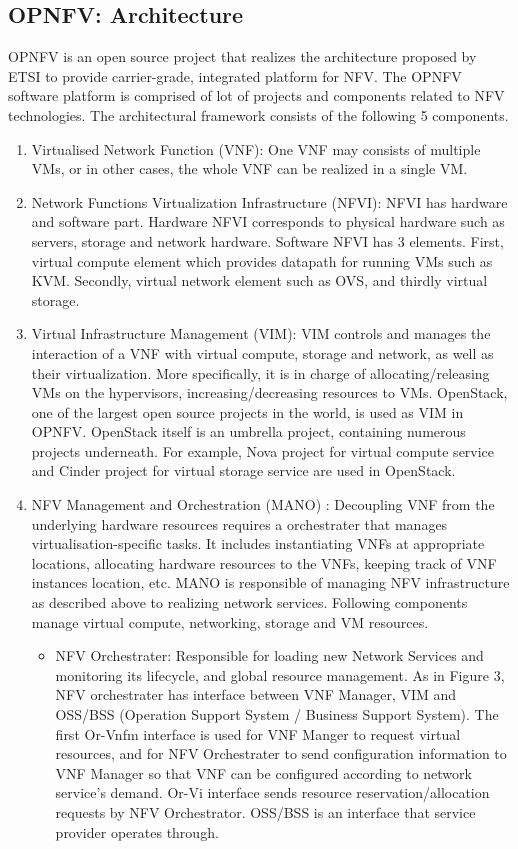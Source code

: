 \subsection{OPNFV: Architecture}
OPNFV\cite{OPNFV} is an open source project that realizes the architecture proposed by ETSI to provide carrier-grade, integrated platform for NFV. The OPNFV software platform is comprised of lot of projects and components related to NFV technologies. The architectural framework consists of the following 5 components. 
\begin{enumerate}
	\item Virtualised Network Function (VNF): One VNF may consists of multiple VMs, or in other cases, the whole VNF can be realized in a single VM.  
	\item Network Functions Virtualization Infrastructure (NFVI): NFVI has hardware and software part. Hardware NFVI corresponds to physical hardware such as servers, storage and network hardware. Software NFVI has 3 elements. First, virtual compute element which provides datapath for running VMs such as KVM. Secondly, virtual network element such as OVS, and thirdly virtual storage. 
	\item Virtual Infrastructure Management (VIM):  VIM controls and manages the interaction of a VNF with virtual compute, storage and network, as well as their virtualization. More specifically, it is in charge of allocating/releasing VMs on the hypervisors, increasing/decreasing resources to VMs. OpenStack, one of the largest open source projects in the world, is used as VIM in OPNFV. OpenStack itself is an umbrella project, containing numerous projects underneath. For example, Nova project for virtual compute service and Cinder project for virtual storage service are used in OpenStack.
	\item NFV Management and Orchestration (MANO) : Decoupling VNF from the underlying hardware resources requires a orchestrater that manages virtualisation-specific tasks. It includes instantiating VNFs at appropriate locations, allocating hardware resources to the VNFs, keeping track of VNF instances location, etc. MANO is responsible of managing NFV infrastructure as described above to realizing network services. Following components manage virtual compute, networking, storage and VM resources. 
		\begin{itemize}
			\item NFV Orchestrater: Responsible for loading new Network Services and monitoring its lifecycle, and global resource management. As in Figure 3, NFV orchestrater has interface between VNF Manager, VIM and OSS/BSS (Operation Support System / Business Support System). The first Or-Vnfm interface is used for VNF Manger to request virtual resources, and for NFV Orchestrater to send configuration information to VNF Manager so that VNF can be configured according to network service's demand. Or-Vi interface sends resource reservation/allocation requests by NFV Orchestrator. OSS/BSS is an interface that service provider operates through. 

\end{itemize}
\end{enumerate}
